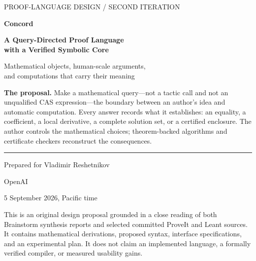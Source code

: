 \documentclass[11pt,a4paper]{article}
\theoremstyle{definition}
\begin{document}
\begin{titlepage}
\color{ink}
{\sffamily\large PROOF-LANGUAGE DESIGN / SECOND ITERATION\par}
\vspace{22mm}
{\sffamily\bfseries\fontsize{34}{39}\selectfont Concord\par}
\vspace{7mm}
{\sffamily\bfseries\fontsize{24}{29}\selectfont A Query-Directed Proof Language\\with a Verified Symbolic Core\par}
\vspace{10mm}
{\Large Mathematical objects, human-scale arguments,\\and computations that carry their meaning\par}
\vspace{12mm}
\begin{thesisbox}
\textbf{The proposal.} Make a mathematical query---not a tactic call and not an unqualified CAS expression---the boundary between an author's idea and automatic computation. Every answer records what it establishes: an equality, a coefficient, a local derivative, a complete solution set, or a certified enclosure. The author controls the mathematical choices; theorem-backed algorithms and certificate checkers reconstruct the consequences.
\end{thesisbox}
\vfill
\rule{\textwidth}{.7pt}
Prepared for Vladimir Reshetnikov\par
OpenAI\par
5 September 2026, Pacific time\par
\vspace{5mm}
{\small This is an original design proposal grounded in a close reading of both Brainstorm synthesis reports and selected committed ProveIt and Leant sources. It contains mathematical derivations, proposed syntax, interface specifications, and an experimental plan. It does not claim an implemented language, a formally verified compiler, or measured usability gains.}
\end{titlepage}
\end{document}
